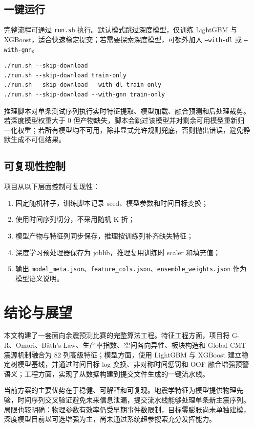 \documentclass[UTF8,a4paper,12pt]{ctexrep}
\begin{document}
\section{一键运行}
完整流程可通过 \texttt{run.sh} 执行。默认模式跳过深度模型，仅训练 LightGBM 与 XGBoost，适合快速稳定提交；若需要探索深度模型，可额外加入 \texttt{--with-dl} 或 \texttt{--with-gnn}。

\begin{lstlisting}[style=bashcode,caption={一键运行命令}]
./run.sh --skip-download
./run.sh --skip-download train-only
./run.sh --skip-download --with-dl train-only
./run.sh --skip-download --with-gnn train-only
\end{lstlisting}

推理脚本对单条测试序列执行实时特征提取、模型加载、融合预测和后处理裁剪。若深度模型权重大于 0 但产物缺失，脚本会跳过该模型并对剩余可用模型重新归一化权重；若所有模型均不可用，除非显式允许规则兜底，否则抛出错误，避免静默生成不可信结果。

\section{可复现性控制}
项目从以下层面控制可复现性：
\begin{enumerate}[label=\arabic*.]
  \item 固定随机种子，训练脚本记录 seed、模型参数和时间目标变换；
  \item 使用时间序列切分，不采用随机 K 折；
  \item 模型产物与特征列同步保存，推理按训练列补齐缺失特征；
  \item 深度学习预处理器保存为 joblib，推理复用训练时 scaler 和填充值；
  \item 输出 \texttt{model\_meta.json}、\texttt{feature\_cols.json}、\texttt{ensemble\_weights.json} 作为模型语义说明。
\end{enumerate}

\chapter{结论与展望}

本文构建了一套面向余震预测比赛的完整算法工程。特征工程方面，项目将 G-R、Omori、Båth's Law、生产率指数、空间各向异性、板块构造和 Global CMT 震源机制融合为 82 列高级特征；模型方面，使用 LightGBM 与 XGBoost 建立稳定树模型基线，并通过时间目标 log 变换、非对称时间惩罚和 OOF 融合增强预警语义；工程方面，实现了从数据构建到提交文件生成的一键流水线。

当前方案的主要优势在于稳健、可解释和可复现。地震学特征为模型提供物理先验，时间序列交叉验证避免未来信息泄漏，提交流水线能够处理单条新主震序列。局限也较明确：物理参数有效率仍受早期事件数限制，目标零膨胀尚未单独建模，深度模型目前以可选增强为主，尚未通过系统超参搜索充分发挥能力。
\end{document}
